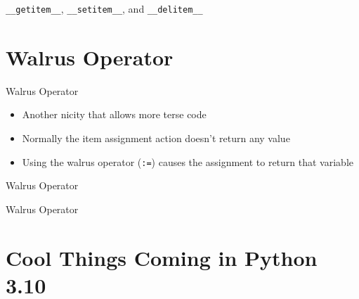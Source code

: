 \documentclass[aspectratio=169,xcolor=dvipsnames]{beamer}
\begin{document}

\begin{frame}{\texttt{\_\_getitem\_\_}, \texttt{\_\_setitem\_\_}, and \texttt{\_\_delitem\_\_}}
  \begin{example}
    
  \end{example}
\end{frame}


\section{Walrus Operator}

\begin{frame}{Walrus Operator}
    \begin{itemize}
      \item Another nicity that allows more terse code
      \item Normally the item assignment action doesn't return any value
      \item Using the walrus operator (\texttt{:=}) causes the assignment to return that variable
    \end{itemize}
\end{frame}


\begin{frame}{Walrus Operator}
  \begin{example}
  
  \end{example}
\end{frame}


\begin{frame}{Walrus Operator}
  \begin{example}
  
  \end{example}
\end{frame}

\section{Cool Things Coming in Python 3.10}
\end{document}
